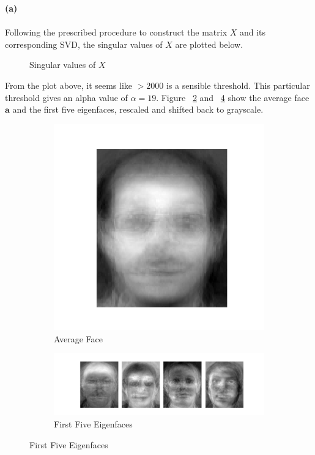 \begin{homeworkProblem}
  \textbf{(a)}
  \\
  \\

  Following the prescribed procedure to construct the matrix $X$ and its corresponding
  SVD, the singular values of $X$ are plotted below.

  \begin{figure}[H]
    \centering
      \caption{Singular values of $X$}%
    \label{fig:sing_vals}
  \end{figure}

  From the plot above, it seems like $> 2000$ is a sensible threshold. This
  particular threshold gives an alpha value of $\alpha=19$. Figure
  ~\ref{fig:avg} and ~\ref{fig:eigfaces} show the average face $\mathbf{a}$ and
  the first five eigenfaces, rescaled and shifted back to grayscale.

  \begin{figure}[H]
    \centering
    \begin{subfigure}{0.4\textwidth}
      \centering
      \includegraphics[width=.5\linewidth]{./images/average.png}
      \caption{Average Face}
      \label{fig:avg}
    \end{subfigure}%
    \begin{subfigure}{0.59\textwidth}
      \centering
      \includegraphics[width=1.0\linewidth]{./images/eigenfaces.png}
      \caption{First Five Eigenfaces}
      \label{fig:eigfaces}
    \end{subfigure}
  \end{figure}


\end{homeworkProblem}
